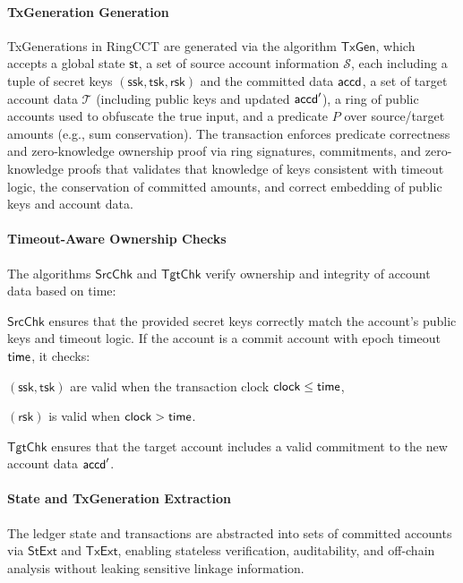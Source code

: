 \paragraph*{TxGeneration Generation}
TxGenerations in RingCCT are generated via the algorithm $\mathsf{TxGen}$, which accepts a global state $\mathsf{st}$, a set of source account information $\mathcal{S}$, each including a tuple of secret keys $(\mathsf{ssk}, \mathsf{tsk}, \mathsf{rsk})$ and the committed data $\mathsf{accd}$, a set of target account data $\mathcal{T}$ (including public keys and updated $\mathsf{accd}'$), a ring of public accounts used to obfuscate the true input, and a predicate $P$ over source/target amounts (e.g., sum conservation).
The transaction enforces predicate correctness and zero-knowledge ownership proof via ring signatures, commitments, and zero-knowledge proofs that validates that knowledge of keys consistent with timeout logic, the conservation of committed amounts, and correct embedding of public keys and account data.

\paragraph*{Timeout-Aware Ownership Checks}
The algorithms $\mathsf{SrcChk}$ and $\mathsf{TgtChk}$ verify ownership and integrity of account data based on time:

$\mathsf{SrcChk}$ ensures that the provided secret keys correctly match the account’s public keys and timeout logic. If the account is a commit account with epoch timeout $\mathsf{time}$, it checks:

$(\mathsf{ssk}, \mathsf{tsk})$ are valid when the transaction clock $\mathsf{clock} \leq \mathsf{time}$,

$(\mathsf{rsk})$ is valid when $\mathsf{clock} > \mathsf{time}$.

$\mathsf{TgtChk}$ ensures that the target account includes a valid commitment to the new account data $\mathsf{accd}'$.

\paragraph*{State and TxGeneration Extraction}
The ledger state and transactions are abstracted into sets of committed accounts via $\mathsf{StExt}$ and $\mathsf{TxExt}$, enabling stateless verification, auditability, and off-chain analysis without leaking sensitive linkage information.

